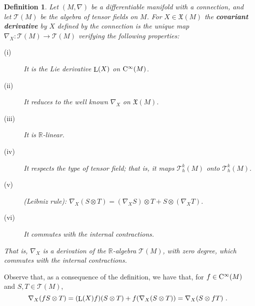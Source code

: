 \documentclass[12pt]{report}
\newtheorem{definition}[teor]{Definition}
\def\vf{\mathfrak X}
\def\Real{\mathbb{R}}
\def\Lie{\mathop{\rm L}\nolimits}
\def\Cinfty{{\rm C}^\infty}
\begin{document}
\begin{definition}
Let $(M,\nabla)$ be a differentiable manifold with a connection, 
and let $\mathcal{T}(M)$ be the algebra of tensor fields on $M$.
For $X\in\vf(M)$ the
\textbf{covariant derivative} by $X$ defined by the connection 
is the unique map $\nabla_{X}\colon\mathcal{T}(M)\to\mathcal{T}(M)$ 
verifying the following properties:
\begin{description}
\item[{\rm (i)}] It is the Lie derivative $\Lie(X)$ on $\Cinfty(M)$.
\item[{\rm (ii)}] It reduces to the well known $\nabla_{X}$ on $\vf(M)$.
\item[{\rm (iii)}] It is $\Real$-linear.
\item[{\rm (iv)}] It respects the type of tensor field; that is, it maps $\mathcal{T}_{h}^{k}(M)$ onto $\mathcal{T}_{h}^{k}(M)$.
\item[{\rm (v)}] 
{\rm (Leibniz rule)}: $\nabla_{X}(S\otimes T)=(\nabla_{X}S)\otimes T+S\otimes(\nabla_{X}T)$.
\item[{\rm (vi)}] It commutes with the internal contractions.
\end{description}
That is, $\nabla_{X}$ is a derivation of the $\Real$-algebra $\mathcal{T}(M)$, with zero degree, which commutes with the internal contractions. 
\end{definition}

Observe that, as a consequence of the definition, we have that,
for $f\in\Cinfty(M)$ and $S,T\in\mathcal{T}(M)$,
$$
\nabla_{X}(fS\otimes T)=
(\Lie(X)f)(S\otimes T)+f(\nabla_{X}(S\otimes T))=\nabla_{X}(S\otimes fT) \ .
$$
\end{document}
